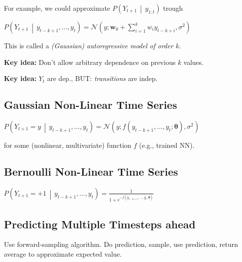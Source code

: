 \documentclass[a4paper,8pt,landscape]{extarticle}
\newcommand{\cN}{\mathcal{N}}
\newcommand{\cProb}[2]{P\left( #1 \,\middle|\, #2 \right)}
\renewcommand{\vec}[1]{\mathbf{#1}}
\newcommand{\vw}{\vec{w}}
\newcommand{\vtheta}{\boldsymbol{\theta}}
\begin{document}
\begin{multicols*}{3}
For example, we could approximate $\cProb{Y_{t+1}}{y_{1:t}}$ trough

$\cProb{Y_{t+1}}{y_{t-k+1},\ldots,y_t}=
\cN\left(y;\vw_0+\sum_{i=1}^kw_iy_{t-k+i},\sigma^2\right)
$

This is called a \emph{(Gaussian) autoregressive model of order $k$}.

\textbf{Key idea:} Don't allow arbitrary dependence on previous $k$ values.

\textbf{Key idea:} $Y_t$ are dep., BUT: \emph{transitions}
are indep.

\subsection{Gaussian Non-Linear Time Series}


$\cProb{Y_{t+1}=y}{y_{t-k+1},\ldots,y_t}=\cN\left(y;
f(y_{t-k+1},\ldots,y_t;\vtheta), \sigma^2
\right)$

for some (nonlinear, multivariate) function $f$ (e.g., trained NN).

\subsection{Bernoulli Non-Linear Time Series}

$\cProb{Y_{t+1}=+1}{y_{t-k+1},\ldots,y_t}=
\frac{1}{1+e^{-f(y_{t-k+1},\ldots,y_t;\vtheta)}}
$

\subsection{Predicting Multiple Timesteps ahead}

Use forward-sampling algorithm. Do prediction, sample, use prediction, return
average to approximate expected value.

\end{multicols*}
\end{document}
